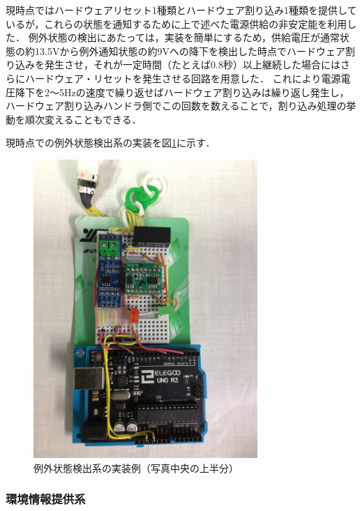 現時点ではハードウェアリセット1種類とハードウェア割り込み1種類を提供しているが，これらの状態を通知するために上で述べた電源供給の非安定能を利用した．
例外状態の検出にあたっては，実装を簡単にするため，供給電圧が通常状態の約13.5Vから例外通知状態の約9Vへの降下を検出した時点でハードウェア割り込みを発生させ，それが一定時間（たとえば0.8秒）以上継続した場合にはさらにハードウェア・リセットを発生させる回路を用意した．
これにより電源電圧降下を2〜5Hzの速度で繰り返せばハードウェア割り込みは繰り返し発生し，ハードウェア割り込みハンドラ側でこの回数を数えることで，割り込み処理の挙動を順次変えることもできる．

現時点での例外状態検出系の実装を図\ref{hohno:RaspberryComPoTE-W}に示す．\\

\begin{figure}[h]
\centering
\includegraphics[width=8.5cm, angle=270]{figspics/RaspberryComPoTE_figW.png}
\caption{例外状態検出系の実装例（写真中央の上半分）}
\label{hohno:RaspberryComPoTE-W}
\end{figure}



\subsubsection{環境情報提供系}


